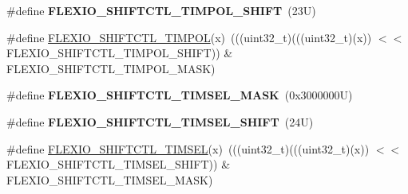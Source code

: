 \begin{DoxyCompactItemize}
\#define {\bfseries F\+L\+E\+X\+I\+O\+\_\+\+S\+H\+I\+F\+T\+C\+T\+L\+\_\+\+T\+I\+M\+P\+O\+L\+\_\+\+S\+H\+I\+FT}~(23\+U)
\item 
\#define \mbox{\hyperlink{group___f_l_e_x_i_o___register___masks_gabeb41831a214d4568c9a050671fe1f06}{F\+L\+E\+X\+I\+O\+\_\+\+S\+H\+I\+F\+T\+C\+T\+L\+\_\+\+T\+I\+M\+P\+OL}}(x)~(((uint32\+\_\+t)(((uint32\+\_\+t)(x)) $<$$<$ F\+L\+E\+X\+I\+O\+\_\+\+S\+H\+I\+F\+T\+C\+T\+L\+\_\+\+T\+I\+M\+P\+O\+L\+\_\+\+S\+H\+I\+FT)) \& F\+L\+E\+X\+I\+O\+\_\+\+S\+H\+I\+F\+T\+C\+T\+L\+\_\+\+T\+I\+M\+P\+O\+L\+\_\+\+M\+A\+SK)
\item 
\mbox{\label{group___f_l_e_x_i_o___register___masks_ga2f85302bf848992adcbffd92197ce9c7}} 
\#define {\bfseries F\+L\+E\+X\+I\+O\+\_\+\+S\+H\+I\+F\+T\+C\+T\+L\+\_\+\+T\+I\+M\+S\+E\+L\+\_\+\+M\+A\+SK}~(0x3000000\+U)
\item 
\mbox{\label{group___f_l_e_x_i_o___register___masks_gaf43726a17118f9e407076edd7ffb4649}} 
\#define {\bfseries F\+L\+E\+X\+I\+O\+\_\+\+S\+H\+I\+F\+T\+C\+T\+L\+\_\+\+T\+I\+M\+S\+E\+L\+\_\+\+S\+H\+I\+FT}~(24\+U)
\item 
\#define \mbox{\hyperlink{group___f_l_e_x_i_o___register___masks_gad0d44468fe0b0b4422d3b71c77ad2e90}{F\+L\+E\+X\+I\+O\+\_\+\+S\+H\+I\+F\+T\+C\+T\+L\+\_\+\+T\+I\+M\+S\+EL}}(x)~(((uint32\+\_\+t)(((uint32\+\_\+t)(x)) $<$$<$ F\+L\+E\+X\+I\+O\+\_\+\+S\+H\+I\+F\+T\+C\+T\+L\+\_\+\+T\+I\+M\+S\+E\+L\+\_\+\+S\+H\+I\+FT)) \& F\+L\+E\+X\+I\+O\+\_\+\+S\+H\+I\+F\+T\+C\+T\+L\+\_\+\+T\+I\+M\+S\+E\+L\+\_\+\+M\+A\+SK)
\end{DoxyCompactItemize}
